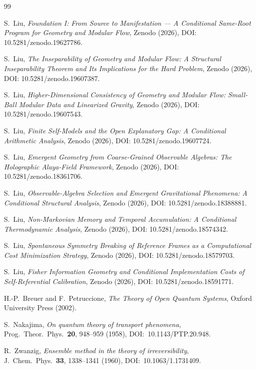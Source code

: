 \documentclass[12pt]{article}
\theoremstyle{definition}
\theoremstyle{remark}
\begin{document}
\begin{thebibliography}{99}
\sloppy

S.~Liu, \emph{Foundation I: From Source to Manifestation --- A Conditional Same-Root Program for Geometry and Modular Flow}, Zenodo (2026), DOI: 10.5281/zenodo.19627786.

S.~Liu, \emph{The Inseparability of Geometry and Modular Flow: A Structural Inseparability Theorem and Its Implications for the Hard Problem}, Zenodo (2026), DOI: 10.5281/zenodo.19607387.

S.~Liu, \emph{Higher-Dimensional Consistency of Geometry and Modular Flow: Small-Ball Modular Data and Linearized Gravity}, Zenodo (2026), DOI: 10.5281/zenodo.19607543.

S.~Liu, \emph{Finite Self-Models and the Open Explanatory Gap: A Conditional Arithmetic Analysis}, Zenodo (2026), DOI: 10.5281/zenodo.19607724.

S.~Liu, \emph{Emergent Geometry from Coarse-Grained Observable Algebras: The Holographic Alaya-Field Framework}, Zenodo (2026), DOI: 10.5281/zenodo.18361706.

S.~Liu, \emph{Observable-Algebra Selection and Emergent Gravitational Phenomena: A Conditional Structural Analysis}, Zenodo (2026), DOI: 10.5281/zenodo.18388881.

S.~Liu, \emph{Non-Markovian Memory and Temporal Accumulation: A Conditional Thermodynamic Analysis}, Zenodo (2026), DOI: 10.5281/zenodo.18574342.

S.~Liu, \emph{Spontaneous Symmetry Breaking of Reference Frames as a Computational Cost Minimization Strategy}, Zenodo (2026), DOI: 10.5281/zenodo.18579703.

S.~Liu, \emph{Fisher Information Geometry and Conditional Implementation Costs of Self-Referential Calibration}, Zenodo (2026), DOI: 10.5281/zenodo.18591771.

H.-P.~Breuer and F.~Petruccione,
\emph{The Theory of Open Quantum Systems},
Oxford University Press (2002).

S.~Nakajima,
\emph{On quantum theory of transport phenomena},
Prog.\ Theor.\ Phys.\ \textbf{20}, 948--959 (1958), DOI:~10.1143/PTP.20.948.

R.~Zwanzig,
\emph{Ensemble method in the theory of irreversibility},
J.\ Chem.\ Phys.\ \textbf{33}, 1338--1341 (1960), DOI:~10.1063/1.1731409.


\end{thebibliography}
\end{document}
